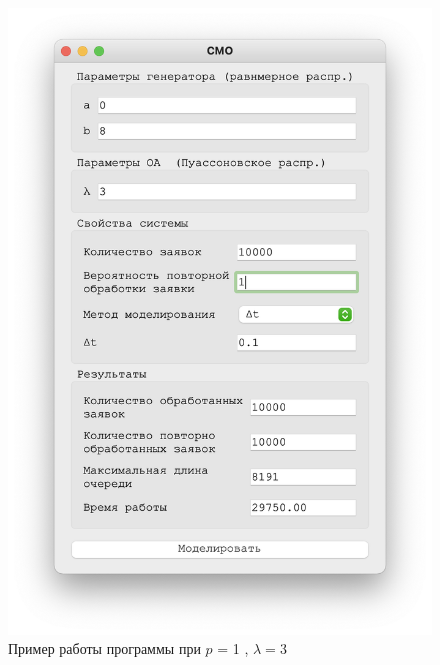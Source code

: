 \begin{figure}[!htb]
\begin{minipage}{0.55\textwidth}
      \includegraphics[width=1\linewidth]{3-1-t}
    \end{minipage}
    \caption{Пример работы программы при $p$ = 1 , $\lambda = 3$}
 \end{figure}




